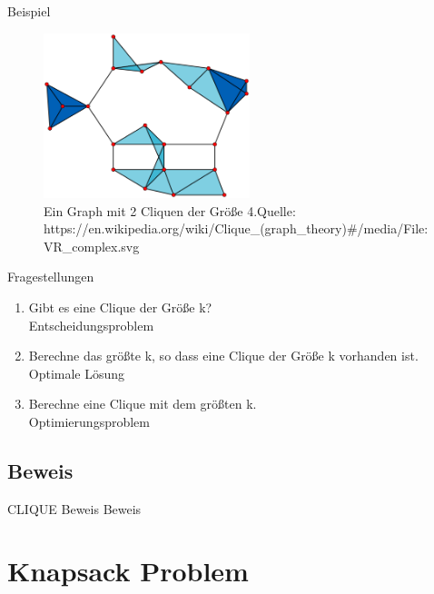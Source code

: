 \documentclass[12pt,donthandout,notes=dontshow,xcolor=table]{beamer}
\begin{document}
\begin{frame}{Beispiel}
\begin{figure}
\includegraphics[width=6cm]{figures/clique2.png}
\caption{Ein Graph mit 2 Cliquen der Größe 4.\newline \newline \tiny Quelle: https://en.wikipedia.org/wiki/Clique\_(graph\_theory)\#/media/File:VR\_complex.svg}
\end{figure}
\end{frame}

\begin{frame}{Fragestellungen}
\begin{enumerate}
\item Gibt es eine Clique der Größe k?\\
\textrightarrow Entscheidungsproblem
\newline \pause
\item Berechne das größte k, so dass eine Clique der Größe k vorhanden ist.\\
\textrightarrow Optimale Lösung
\newline \pause
\item Berechne eine Clique mit dem größten k.\\
\textrightarrow Optimierungsproblem
\end{enumerate}
\end{frame}

\subsection{Beweis}
\begin{frame}{CLIQUE Beweis}
Beweis
\end{frame}



\section{Knapsack Problem}
\end{document}
